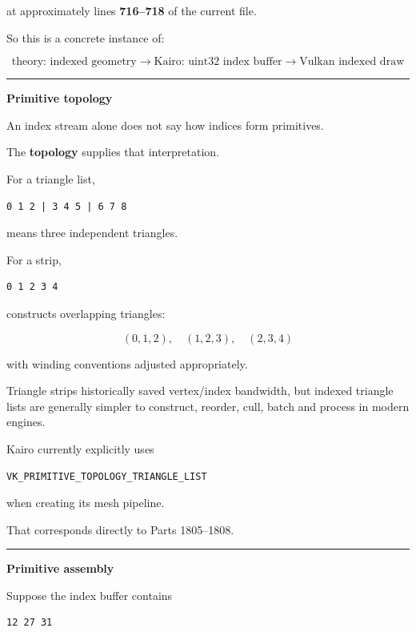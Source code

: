 at approximately lines \textbf{716--718} of the current file.

So this is a concrete instance of:

\[
\boxed{\text{theory: indexed geometry}
\rightarrow
\text{Kairo: uint32 index buffer}
\rightarrow
\text{Vulkan indexed draw}}
\]

\begin{center}\rule{0.5\linewidth}{0.5pt}\end{center}

\textbf{Primitive topology}

An index stream alone does not say how indices form primitives.

The \textbf{topology} supplies that interpretation.

For a triangle list,

\begin{verbatim}
0 1 2 | 3 4 5 | 6 7 8
\end{verbatim}

means three independent triangles.

For a strip,

\begin{verbatim}
0 1 2 3 4
\end{verbatim}

constructs overlapping triangles:

\[
(0,1,2),\quad
(1,2,3),\quad
(2,3,4)
\]

with winding conventions adjusted appropriately.

Triangle strips historically saved vertex/index bandwidth, but indexed triangle lists are generally simpler to construct, reorder, cull, batch and process in modern engines.

Kairo currently explicitly uses

\begin{verbatim}
VK_PRIMITIVE_TOPOLOGY_TRIANGLE_LIST
\end{verbatim}

when creating its mesh pipeline.

That corresponds directly to Parts 1805--1808.

\begin{center}\rule{0.5\linewidth}{0.5pt}\end{center}

\textbf{Primitive assembly}

Suppose the index buffer contains

\begin{verbatim}
12 27 31
\end{verbatim}

